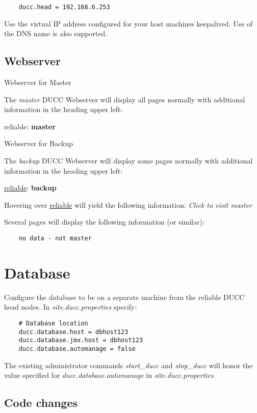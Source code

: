 \documentclass[letterpaper]{article}
\begin{document}
    \begin{verbatim}
	ducc.head = 192.168.6.253
   	\end{verbatim}
    
    Use the virtual IP address configured for your host machines keepalived. 
    Use of the DNS name is also supported.  
    
\subsection{Webserver}

	Webserver for Master

	The {\em master} DUCC Webserver will display all pages normally with additional
	information in the heading upper left:
	
	reliable: \textbf{master}
	
	Webserver for Backup
	
	The {\em backup} DUCC Webserver will display some pages normally with additional
	information in the heading upper left:
	
	\underline{reliable}: \textbf{backup}
   	
   	Hovering over \underline{reliable} will yield the following information:
   	{\em Click to visit master}
   	
   	Several pages will display the following information (or similar):
   	
   	\begin{verbatim}
	no data - not master
   	\end{verbatim}

\section{Database}

	Configure the database to be on a separate machine from the reliable DUCC head nodes.
	In {\em site.ducc.properties} specify:
	
	\begin{verbatim}
	# Database location
    ducc.database.host = dbhost123
    ducc.database.jmx.host = dbhost123
    ducc.database.automanage = false
   	\end{verbatim}
   	
   	The existing administrator commands {\em start\_ducc} and {\em stop\_ducc} will
   	honor the value specified for {\em ducc.database.automanage} in {\em site.ducc.properties}.

\subsection{Code changes}
\end{document}
